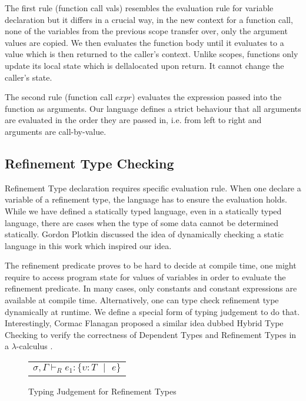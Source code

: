 \documentclass[a4paper,12pt]{report}
\begin{document}
\par
The first rule (function call vals) resembles the evaluation rule for 
variable declaration but it differs in a crucial way, in the new context for a 
function call, none of the variables from the previous scope transfer over, only 
the argument values are copied. We then evaluates the function body until it 
evaluates to a value which is then returned to the caller's context. Unlike 
scopes, functions only update its local state which is dellalocated upon return. 
It cannot change the caller's state. 

\par
The second rule (function call $expr$) evaluates the expression passed into the 
function as arguments. Our language defines a strict behaviour that all 
arguments are evaluated in the order they are passed in, i.e. from left to right 
and arguments are call-by-value.

\subsection{Refinement Type Checking}
Refinement Type declaration requires specific evaluation rule. When one declare 
a variable of a refinement type, the language has to ensure the evaluation 
holds. While we have defined a statically typed language, even in a statically 
typed language, there are cases when the type of some data cannot be determined 
statically. Gordon Plotkin discussed the idea of dynamically checking a static 
language in this work \cite{dynamicCheckStaticLanguage} which inspired our idea.

\par
The refinement predicate proves to be hard to decide at compile time, one might 
require to access program state for values of variables in order 
to evaluate the refinement predicate. In many cases, 
only constants and constant expressions are available at compile time. 
Alternatively, one can type check refinement type dynamically at runtime. We 
define a special form of typing judgement to do that. Interestingly, 
Cormac Flanagan proposed a similar idea dubbed Hybrid Type Checking to verify 
the correctness of Dependent Types and Refinement Types in a $\lambda$-calculus 
\cite{hybridTypeChecking}.


\begin{figure}[H]
  \begin{center}
    \begin{tabular} {c}
      $\sigma, \Gamma \vdash_{R} e_1 : \{\upsilon : T \text{ }|\text{ }e\}$
    \end{tabular}
  \end{center}
  \caption{Typing Judgement for Refinement Types}
  \label{fig:refine_judgement}
\end{figure}
\end{document}
